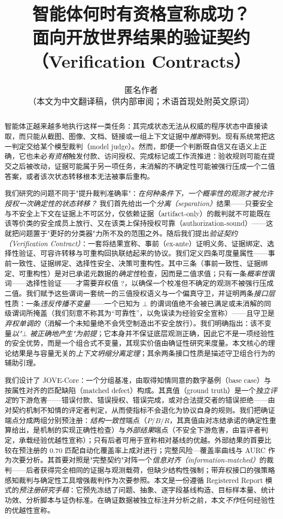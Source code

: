 \documentclass[11pt]{ctexart}
\title{\bfseries 智能体何时有资格宣称成功？\\[2pt]\large 面向开放世界结果的验证契约（Verification Contracts）}
\author{匿名作者\\[2pt]\small （本文为中文翻译稿，供内部审阅；术语首现处附英文原词）}
\date{}
\begin{document}
\maketitle

\begin{abstract}
\noindent 智能体正越来越多地执行这样一类任务：其完成状态无法从权威的程序状态中直接读取，而只能从截图、图像、文档、链接或一组上下文证据中\emph{推断}得到。现有系统常把这一判定交给某个模型裁判（model judge）。然而，即便一个判断既自信又在语义上正确，它也未必\emph{有资格}触发付款、访问授权、完成标记或工作流推进：验收规则可能在提交之后被改动，证据可能属于另一项任务，未消解的不确定性可能被强行压成一个二值答案，或者该次状态转移根本无法被事后重构。

我们研究的问题不同于"提升裁判准确率"：\emph{在何种条件下，一个概率性的观测才被允许授权一次确定性的状态转移？} 我们首先给出一个\emph{分离（separation）}结果——只要安全与不安全上下文在证据上不可区分，仅依赖证据（artifact-only）的裁判就不可能既在该等价类的安全成员上放行、又在该类上保持授权可靠（authorization-sound）——这就把问题置于"更好的分类器"力所不及的范围之外。随后我们提出\emph{验证契约（Verification Contract）}：一套将结果宣称、事前（ex-ante）证明义务、证据绑定、选择性验证、可容许转移与可重构回执联结起来的协议。我们定义四条可度量属性——事前一致性、证据绑定、选择性安全、决策可重构性。其中三条（事前一致性、证据绑定、可重构性）是对已承诺元数据的\emph{确定性}检查，因而是二值求值；只有一条\emph{概率性}谓词——选择性验证——才需要弃权值 $?$，以确保一个校准但不确定的观测不被强行压成二值。我们赋予这些谓词一套统一的三值授权语义与一个偏真守卫，并证明两条\emph{接口层}性质：一条\emph{违反传播不变量}——一个已知为 $\bot$ 的谓词值绝不会被已满足或未消解的同级谓词所掩盖（我们刻意不称其为“可靠性”，以免误读为经验安全宣称）——且守卫是\emph{弃权单调的}（消解一个未知量绝不会凭空制造出不安全放行）。我们明确指出：该不变量\emph{以"$\bot$ 被正确地产生"为前提}；它本身并不保证底层观测正确，因此它不是一项经验性的安全优势，而是一个组合式不变量，其现实价值由确证性研究来度量。本文核心的理论结果是与容量无关的\emph{上下文坍缩分离定理}；其余两条接口性质是描述守卫组合行为的辅助引理。

我们设计了 JOVE-Core：一个分组基准，由取得知情同意的数字基例（base case）与按属性对齐的匹配缺陷（matched defect）构成。其真值（ground truth）是一个\emph{独立评定}的下游危害——错误付款、错误授权、错误完成，或对合法提交者的错误拒绝——由对契约机制不知情的评定者判定，从而使指标不会退化为协议自身的规则。我们把确证端点分成两组分别预注册：\emph{结构一致性}端点（$P/B/R$，其真值由对冻结承诺的确定性重算给出，是机制的实现正确性检查）与\emph{外部结果}端点（不安全下游危害，由盲评者判定，承载经验优越性宣称）；只有后者可用于宣称相对基线的优越。外部结果的首要比较在预注册的 0.70 匹配自动化覆盖率上成对进行；完整风险—覆盖率曲线与 AURC 作为次要分析。其首要对照是"完整契约"对阵一个\emph{信息对齐（information-matched）}的裁判——后者获得完全相同的证据与观测载荷，但缺少结构性强制；带弃权接口的强策略感知裁判与确定性工具增强裁判作为次要参照。本文是一份遵循 Registered Report 模式的\emph{预注册研究手稿}：它预先冻结了问题、抽象、逐字段基线构造、目标样本量、统计功效、分析脚本与证伪标准。在确证数据被独立标注并分析之前，本文\emph{不作}任何经验性的优越性宣称。
\end{abstract}
\end{document}
